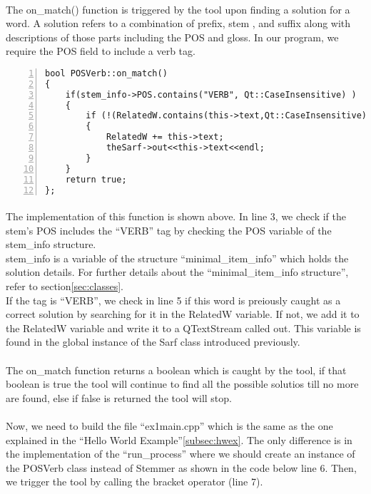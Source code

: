 \documentclass{article}
\begin{document}
\paragraph{}
The on\_match() function is triggered by the tool upon finding a solution for a word. A solution refers to a combination of prefix, stem , and suffix along with descriptions of those parts including the POS and gloss. In our program, we require the POS field to include a verb tag.

\begin{Verbatim}[numbers=left]
bool POSVerb::on_match()
{
    if(stem_info->POS.contains("VERB", Qt::CaseInsensitive) )
    {
        if (!(RelatedW.contains(this->text,Qt::CaseInsensitive)))
        {
            RelatedW += this->text;
            theSarf->out<<this->text<<endl;
        }
    }
    return true;
};
\end{Verbatim}

\paragraph{}
The implementation of this function is shown above. In line 3, we check if the stem's POS includes the ``VERB'' tag by checking the POS variable of the stem\_info structure.\\

stem\_info is a variable of the structure ``minimal\_item\_info'' which holds the solution details. For further details about the ``minimal\_item\_info structure'', refer to section\ref{sec:classes}.\\

If the tag is ``VERB'', we check in line 5 if this word is preiously caught as a correct solution by searching for it in the RelatedW variable. If not, we add it to the RelatedW variable and write it to a QTextStream called out. This variable is found in the global instance of the Sarf class introduced previously.

\paragraph{}
The on\_match function returns a boolean which is caught by the tool, if that boolean is true the tool will continue to find all the possible solutios till no more are found, else if false is returned the tool will stop.

\paragraph{}
Now, we need to build the file ``ex1main.cpp'' which is the same as the one explained in the ``Hello World Example''\ref{subsec:hwex}. The only difference is in the implementation of the ``run\_process'' where we should create an instance of the POSVerb class instead of Stemmer as shown in the code below line 6. Then, we trigger the tool by calling the bracket operator (line 7).
\end{document}
